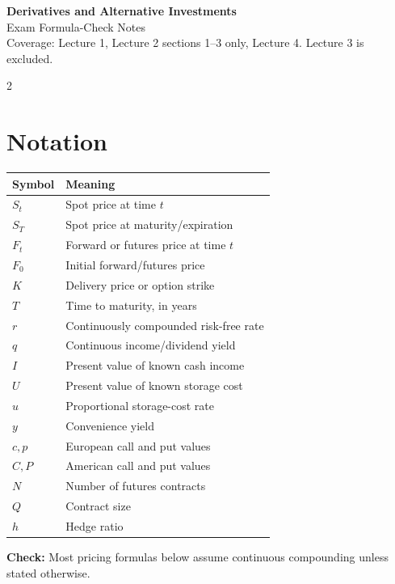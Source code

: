 \documentclass[10pt]{article}
\newcommand{\note}[1]{\textcolor{accent}{\textbf{Check:}} #1}
\begin{document}
\begin{center}
    {\Large \textbf{Derivatives and Alternative Investments}}\\
    \vspace{0.2em}
    {\large Exam Formula-Check Notes}\\
    \vspace{0.2em}
    \small Coverage: Lecture 1, Lecture 2 sections 1--3 only, Lecture 4. Lecture 3 is excluded.
\end{center}

\vspace{0.4em}

\begin{multicols}{2}

\section*{Notation}
\begin{tabular}{@{}ll@{}}
\toprule
Symbol & Meaning \\
\midrule
$S_t$ & Spot price at time $t$ \\
$S_T$ & Spot price at maturity/expiration \\
$F_t$ & Forward or futures price at time $t$ \\
$F_0$ & Initial forward/futures price \\
$K$ & Delivery price or option strike \\
$T$ & Time to maturity, in years \\
$r$ & Continuously compounded risk-free rate \\
$q$ & Continuous income/dividend yield \\
$I$ & Present value of known cash income \\
$U$ & Present value of known storage cost \\
$u$ & Proportional storage-cost rate \\
$y$ & Convenience yield \\
$c,p$ & European call and put values \\
$C,P$ & American call and put values \\
$N$ & Number of futures contracts \\
$Q$ & Contract size \\
$h$ & Hedge ratio \\
\bottomrule
\end{tabular}

\note{Most pricing formulas below assume continuous compounding unless stated otherwise.}


\end{multicols}
\end{document}

